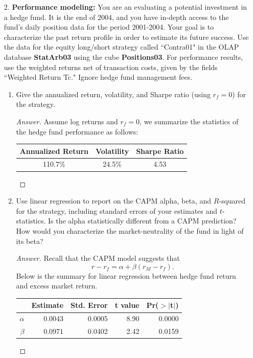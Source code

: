 \documentclass[10pt]{article}
\begin{document}
\begin{enumerate}
    \item[2.] \textbf{Performance modeling:} You are an evaluating a potential investment in a hedge fund. It is the end of 2004, and you have in-depth access to the fund’s daily position data for the period 2001-2004. Your goal is to characterize the past return profile in order to estimate its future success. Use the data for the equity long/short strategy called ``Contra01" in the OLAP database \textbf{StatArb03} using the cube \textbf{Positions03}. For performance results, use the weighted returns net of transaction costs, given by the fields ``Weighted Return Tc." Ignore hedge fund management fees.
    \begin{enumerate}
        \item  Give the annualized return, volatility, and Sharpe ratio (using $r_f=0$) for the strategy.
        \begin{proof}[Answer] Assume log returns and $r_f=0$, we summarize the statistics of the hedge fund performance as follows:
        \begin{table}[ht]
\centering
\begin{tabular}{ccc}
  \hline
  Annualized Return & Volatility & Sharpe Ratio \\ 
  \hline
  110.7\% & 24.5\% & 4.53 \\ 
   \hline
\end{tabular}
\end{table}
        
        \end{proof}
        \item  Use linear regression to report on the CAPM alpha, beta, and $R$-squared for the strategy, including standard errors of your estimates and $t$-statistics. Is the alpha statistically different from a CAPM prediction? How would you characterize the market-neutrality of the fund in light of its beta?
        \begin{proof}[Answer] Recall that the CAPM model suggests that 
        $$r-r_f = \alpha + \beta(r_M - r_f).$$
        Below is the summary for linear regression between hedge fund return and excess market return.
        \begin{table}[ht]
\centering
\begin{tabular}{rrrrr}
  \hline
 & Estimate & Std. Error & t value & Pr($>$$|$t$|$) \\ 
  \hline
$\alpha$ & 0.0043 & 0.0005 & 8.90 & 0.0000 \\ 
  $\beta$ & 0.0971 & 0.0402 & 2.42 & 0.0159 \\ 
   \hline
\end{tabular}


\end{table}
\end{proof}
\end{enumerate}
\end{enumerate}
\end{document}
